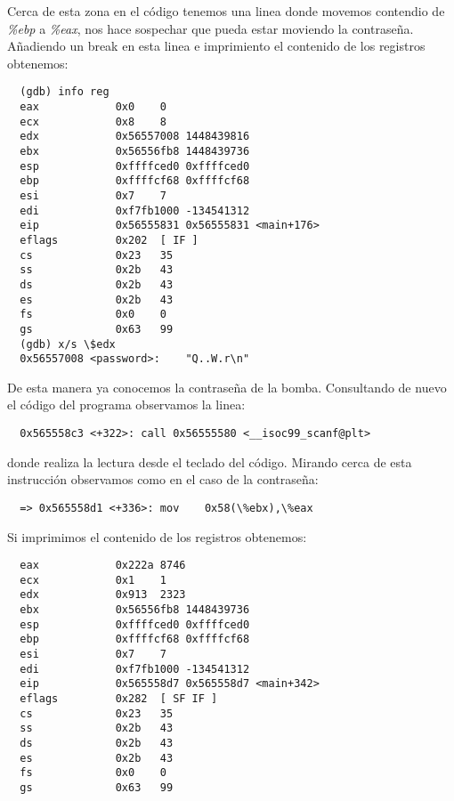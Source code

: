 \documentclass{article}
\newcommand{\n}[1]{{\color{gray}#1}}
\begin{document}
Cerca de esta zona en el código tenemos una linea donde movemos
contendio de \textit{\%ebp} a \textit{\%eax}, nos hace sospechar que
pueda estar moviendo la contraseña. Añadiendo un break en esta linea e
imprimiento el contenido de los registros obtenemos:

\newpage

\begin{lstlisting}
  (gdb) info reg
  eax            0x0	0
  ecx            0x8	8
  edx            0x56557008	1448439816
  ebx            0x56556fb8	1448439736
  esp            0xffffced0	0xffffced0
  ebp            0xffffcf68	0xffffcf68
  esi            0x7	7
  edi            0xf7fb1000	-134541312
  eip            0x56555831	0x56555831 <main+176>
  eflags         0x202	[ IF ]
  cs             0x23	35
  ss             0x2b	43
  ds             0x2b	43
  es             0x2b	43
  fs             0x0	0
  gs             0x63	99
  (gdb) x/s \$edx
  0x56557008 <password>:	"Q..W.r\n"

\end{lstlisting}
 
De esta manera ya conocemos la contraseña de la bomba.
Consultando de nuevo el código del programa observamos la linea:

\begin{lstlisting}
  0x565558c3 <+322>: call 0x56555580 <__isoc99_scanf@plt>
\end{lstlisting}

donde realiza la lectura desde el teclado del código. Mirando cerca de
esta instrucción observamos como en el caso de la contraseña:

\begin{lstlisting}
  => 0x565558d1 <+336>:	mov    0x58(\%ebx),\%eax
\end{lstlisting}

Si imprimimos el contenido de los registros obtenemos:

\begin{lstlisting}
  eax            0x222a	8746
  ecx            0x1	1
  edx            0x913	2323
  ebx            0x56556fb8	1448439736
  esp            0xffffced0	0xffffced0
  ebp            0xffffcf68	0xffffcf68
  esi            0x7	7
  edi            0xf7fb1000	-134541312
  eip            0x565558d7	0x565558d7 <main+342>
  eflags         0x282	[ SF IF ]
  cs             0x23	35
  ss             0x2b	43
  ds             0x2b	43
  es             0x2b	43
  fs             0x0	0
  gs             0x63	99
\end{lstlisting}
\end{document}
